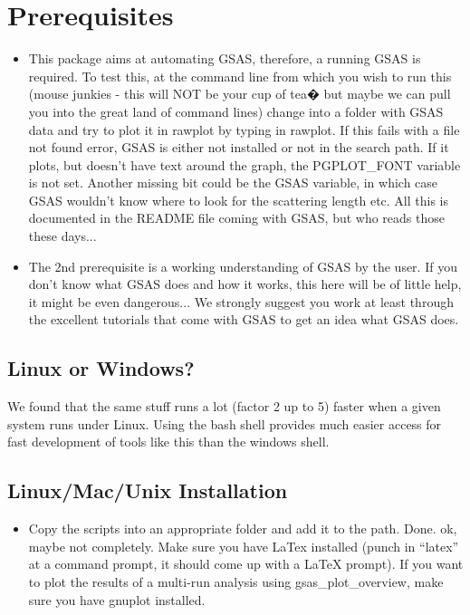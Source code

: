 \documentclass{article}
\begin{document}
\section{Prerequisites}
\begin{itemize}
	\item This package aims at automating GSAS, therefore, a running GSAS is required. To test this, at the command line from which you wish to run this (mouse junkies - this will NOT be your cup of tea� but maybe we can pull you into the great land of command lines) change into a folder with GSAS data and try to plot it in rawplot by typing in rawplot. If this fails with a file not found error, GSAS is either not installed or not in the search path. If it plots, but doesn't have text around the graph, the PGPLOT\_FONT variable is not set. Another missing bit could be the GSAS variable, in which case GSAS wouldn't know where to look for the scattering length etc. All this is documented in the README file coming with GSAS, but who reads those these days...
	\item The 2nd prerequisite is a working understanding of GSAS by the user. If you don't know what GSAS does and how it works, this here will be of little help, it might be even dangerous... We strongly suggest you work at least through the excellent tutorials that come with GSAS to get an idea what GSAS does.

\end{itemize}

\subsection{Linux or Windows?}

We found that the same stuff runs a lot (factor 2 up to 5) faster when a given system runs under Linux. Using the bash shell provides much easier access for fast development of tools like this than the windows shell.

\subsection{Linux/Mac/Unix Installation}

\begin{itemize}
	\item Copy the scripts into an appropriate folder and add it to the path. Done.
ok, maybe not completely. Make sure you have LaTex installed (punch in ``latex'' at a command prompt, it should come up with a LaTeX prompt). If you want to plot the results of a multi-run analysis using gsas\_plot\_overview, make sure you have gnuplot installed.
\end{itemize}
\end{document}
